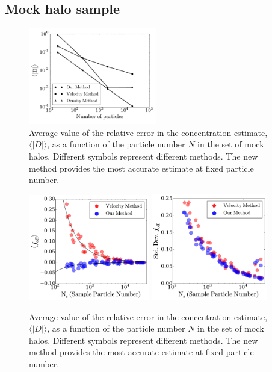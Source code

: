 \documentclass[a4,useAMS,usenatbib,usegraphicx]{mn2e}
\newcommand{\avg}[1]{\langle{#1}\rangle}
\begin{document}
\subsection{Mock halo sample}

\begin{figure}
\begin{center}
  \includegraphics[width=0.50\textwidth]{error.pdf}
\end{center}
\vspace{-0.5cm}
\caption{Average value of the relative error in the concentration
  estimate, $\avg{|D|}$, as a function of the particle number $N$ in
  the set of mock halos. Different symbols represent different
  methods. The new method provides the most accurate estimate at fixed
  particle number.  
    \label{fig:error}}
\end{figure}

\begin{figure}
\begin{center}
  \includegraphics[width=0.47\textwidth]{avg_foff_bolshoi.pdf}
  \includegraphics[width=0.45\textwidth]{stddev_foff_bolshoi.pdf}
\end{center}
\vspace{-0.5cm}
\caption{Average value of the relative error in the concentration
  estimate, $\avg{|D|}$, as a function of the particle number $N$ in
  the set of mock halos. Different symbols represent different
  methods. The new method provides the most accurate estimate at fixed
  particle number.  
    \label{fig:error}}
\end{figure}
\end{document}
